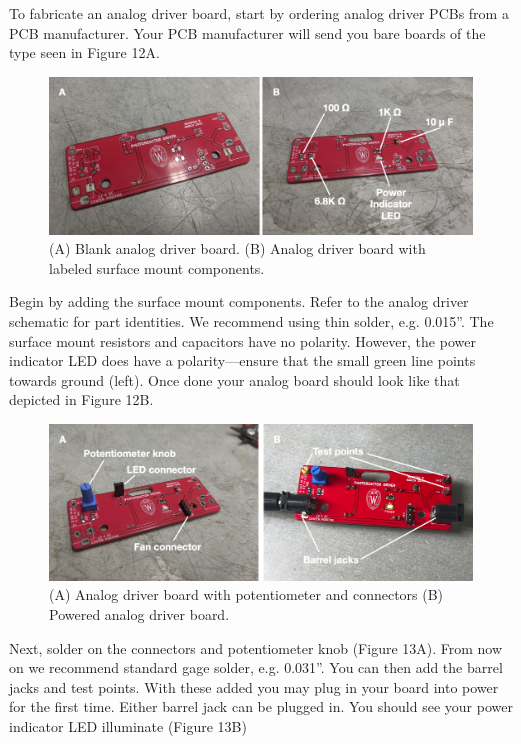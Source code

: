 \documentclass[11pt]{article}
\begin{document}
To fabricate an analog driver board, start by ordering analog driver PCBs from a PCB manufacturer. Your PCB manufacturer will send you bare boards of the type seen in Figure 12A.

\begin{figure}[H]
	\centering
	\includegraphics[width=\textwidth]{"./fig12.png"}
	\caption{(A) Blank analog driver board. (B) Analog driver board with labeled surface mount components.}
\end{figure}

Begin by adding the surface mount components.
Refer to the analog driver schematic for part identities.
We recommend using thin solder, e.g. 0.015''.
The surface mount resistors and capacitors have no polarity.
However, the power indicator LED does have a polarity---ensure that the small green line points towards ground (left).
Once done your analog board should look like that depicted in Figure 12B.

\begin{figure}[H]
	\centering
	\includegraphics[width=\textwidth]{"./fig13.png"}
	\caption{(A) Analog driver board with potentiometer and connectors (B) Powered analog driver board.}
\end{figure}

Next, solder on the connectors and  potentiometer knob (Figure 13A).
From now on we recommend standard gage solder, e.g. 0.031''.
You can then add the barrel jacks and test points.
With these added you may plug in your board into power for the first time.
Either barrel jack can be plugged in.
You should see your power indicator LED illuminate (Figure 13B)
\end{document}
